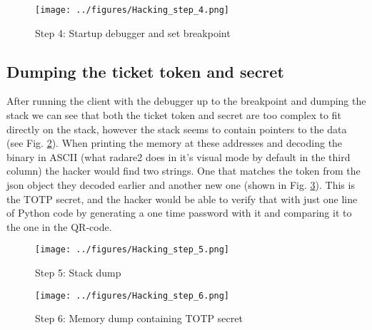 \begin{figure}[H]
    \centering
    \texttt{[image: ../figures/Hacking\_step\_4.png]}
    \caption{Step 4: Startup debugger and set breakpoint}
    \label{fig:HackingStep4}
\end{figure}

\subsection{Dumping the ticket token and secret}
After running the client with the debugger up to the breakpoint and dumping the stack we can see that both the ticket token and secret are too complex to fit directly on the stack, however the stack seems to contain pointers to the data (see Fig. \ref{fig:HackingStep5}). When printing the memory at these addresses and decoding the binary in ASCII (what radare2 does in it's visual mode by default in the third column) the hacker would find two strings. One that matches the token from the json object they decoded earlier and another new one (shown in Fig. \ref{fig:HackingStep6}). This is the TOTP secret, and the hacker would be able to verify that with just one line of Python code by generating a one time password with it and comparing it to the one in the QR-code.

\begin{figure}[H]
    \centering
    \texttt{[image: ../figures/Hacking\_step\_5.png]}
    \caption{Step 5: Stack dump}
    \label{fig:HackingStep5}
\end{figure}
\begin{figure}[H]
    \centering
    \texttt{[image: ../figures/Hacking\_step\_6.png]}
    \caption{Step 6: Memory dump containing TOTP secret}
    \label{fig:HackingStep6}
\end{figure}
